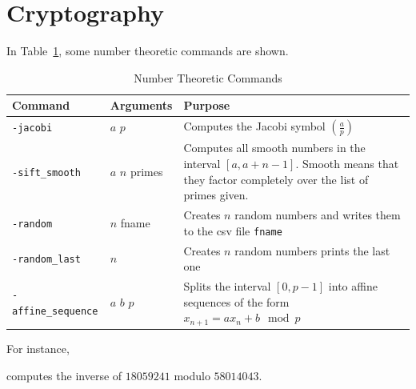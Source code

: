 



\bigskip
\clearpage



\section{Cryptography}
\label{sec:crypto}







\bigskip
\clearpage
In Table~\ref{tab:nt}, some number theoretic commands are shown.
\begin{table}
	\begin{center}
	\begin{tabular}{|p{4cm}|p{3cm}|p{7cm}|}
		\hline
		Command & Arguments & Purpose \\
		\hline
		\hline
		\verb'-jacobi' & $a$ $p$ & Computes the Jacobi symbol $\left( \frac{a}{p} \right)$\\
		\hline
		\verb'-sift_smooth' & $a$ $n$ primes  & Computes all smooth numbers in the interval $[a,a+n-1]$. Smooth means that they factor completely over the list of primes given. \\
		\hline
		\verb'-random' & $n$ fname & Creates $n$ random numbers and writes them to the csv file \verb'fname' \\
		\hline
		\verb'-random_last' & $n$  & Creates $n$ random numbers prints the last one \\
		\hline
		\verb'-affine_sequence' & $a$ $b$ $p$  & Splits the interval $[0,p-1]$ into affine sequences of the form $x_{n+1} = a x_n + b \mod p$ \\
		\hline
		\end{tabular}
	\end{center}
	\caption{\label{tab:nt}Number Theoretic Commands}
	\end{table}
For instance,
{\tt

}
computes the inverse of $18059241$ modulo $58014043$.

\bigskip


